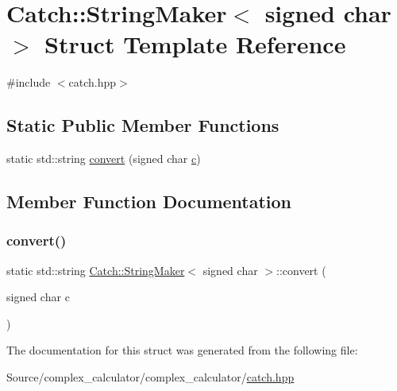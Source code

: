 \hypertarget{struct_catch_1_1_string_maker_3_01signed_01char_01_4}{}\section{Catch\+:\+:String\+Maker$<$ signed char $>$ Struct Template Reference}
\label{struct_catch_1_1_string_maker_3_01signed_01char_01_4}


{\ttfamily \#include $<$catch.\+hpp$>$}

\subsection*{Static Public Member Functions}
\begin{DoxyCompactItemize}
\item 
static std\+::string \mbox{\hyperlink{struct_catch_1_1_string_maker_3_01signed_01char_01_4_a5ec41f32916539dc90130539db8222cf}{convert}} (signed char \mbox{\hyperlink{complex__calculator_8cpp_a05f328ec4e90bb80a9bd5808f6717512}{c}})
\end{DoxyCompactItemize}


\subsection{Member Function Documentation}
\mbox{\label{struct_catch_1_1_string_maker_3_01signed_01char_01_4_a5ec41f32916539dc90130539db8222cf}} 
\subsubsection{\texorpdfstring{convert()}{convert()}}
{\footnotesize\ttfamily static std\+::string \mbox{\hyperlink{struct_catch_1_1_string_maker}{Catch\+::\+String\+Maker}}$<$ signed char $>$\+::convert (\begin{DoxyParamCaption}\item[{signed char}]{c }\end{DoxyParamCaption})\hspace{0.3cm}{\ttfamily [static]}}



The documentation for this struct was generated from the following file\+:\begin{DoxyCompactItemize}
\item 
Source/complex\+\_\+calculator/complex\+\_\+calculator/\mbox{\hyperlink{catch_8hpp}{catch.\+hpp}}\end{DoxyCompactItemize}
